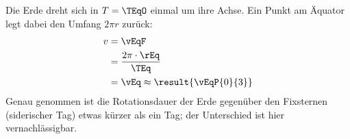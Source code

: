 Die Erde dreht sich in $T = \TEqO$ einmal um ihre Achse. Ein Punkt am Äquator legt dabei den Umfang $2\pi r$ zurück:
\begin{align}
 v &= \vEqF \\
   &= \frac{2\pi\cdot\rEq}{\TEq} \\
   &= \vEq \approx \result{\vEqP{0}{3}}
\end{align}
Genau genommen ist die Rotationsdauer der Erde gegenüber den Fixsternen (siderischer Tag) etwas kürzer als ein Tag; der Unterschied ist hier vernachlässigbar.
